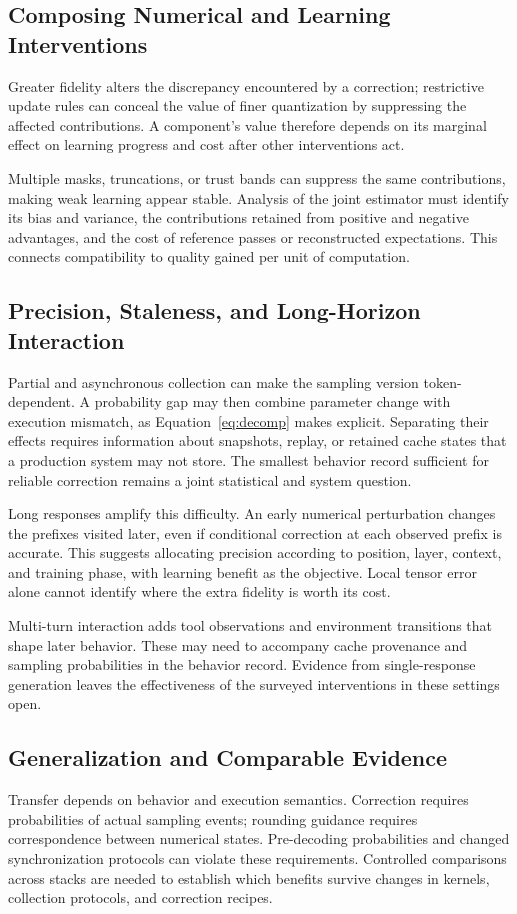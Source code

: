 \subsection{Composing Numerical and Learning Interventions}
Greater fidelity alters the discrepancy encountered by a correction; restrictive update rules can conceal the value of finer quantization by suppressing the affected contributions. A component's value therefore depends on its marginal effect on learning progress and cost after other interventions act.

Multiple masks, truncations, or trust bands can suppress the same contributions, making weak learning appear stable. Analysis of the joint estimator must identify its bias and variance, the contributions retained from positive and negative advantages, and the cost of reference passes or reconstructed expectations. This connects compatibility to quality gained per unit of computation.

\subsection{Precision, Staleness, and Long-Horizon Interaction}
Partial and asynchronous collection can make the sampling version token-dependent. A probability gap may then combine parameter change with execution mismatch, as Equation~\eqref{eq:decomp} makes explicit. Separating their effects requires information about snapshots, replay, or retained cache states that a production system may not store. The smallest behavior record sufficient for reliable correction remains a joint statistical and system question.

Long responses amplify this difficulty. An early numerical perturbation changes the prefixes visited later, even if conditional correction at each observed prefix is accurate. This suggests allocating precision according to position, layer, context, and training phase, with learning benefit as the objective. Local tensor error alone cannot identify where the extra fidelity is worth its cost.

Multi-turn interaction adds tool observations and environment transitions that shape later behavior. These may need to accompany cache provenance and sampling probabilities in the behavior record. Evidence from single-response generation leaves the effectiveness of the surveyed interventions in these settings open.

\subsection{Generalization and Comparable Evidence}
Transfer depends on behavior and execution semantics. Correction requires probabilities of actual sampling events; rounding guidance requires correspondence between numerical states. Pre-decoding probabilities and changed synchronization protocols can violate these requirements. Controlled comparisons across stacks are needed to establish which benefits survive changes in kernels, collection protocols, and correction recipes.

